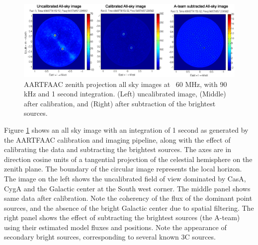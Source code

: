 \documentclass{aa}
\begin{document}
\begin{figure}[t]
\includegraphics[width=1\textwidth]{Figs/uncal_cal_deconv_night.eps}
\caption{AARTFAAC zenith projection  all sky images at ~60  MHz, with 90 kHz
  and  1   second  integration.   (Left)  uncalibrated  image,   (Middle)  after
  calibration, and (Right) after subtraction of the brightest sources.}
\label{fig:uncal_cal_deconv_night}
\end{figure}

Figure  \ref{fig:uncal_cal_deconv_night}   shows  an  all  sky   image  with  an
integration of  1 second  as generated by  the AARTFAAC calibration  and imaging
pipeline,  along with the  effect of  calibrating the  data and  subtracting the
brightest  sources.  The  axes are  in direction  cosine units  of  a tangential
projection of the celestial hemisphere on the zenith plane.  The boundary of the
circular image  represents the local  horizon. The image  on the left  shows the
uncalibrated field  of view dominated by  CasA, CygA and the  Galactic center at
the South west corner. The middle panel shows same data after calibration.  Note
the coherency of the flux of the  dominant point sources, and the absence of the
bright  Galactic center due  to spatial  filtering.  The  right panel  shows the
effect of subtracting  the brightest sources (the A-team)  using their estimated
model fluxes  and positions.  Note  the appearance of secondary  bright sources,
corresponding to several known 3C sources.

 
\end{document}
